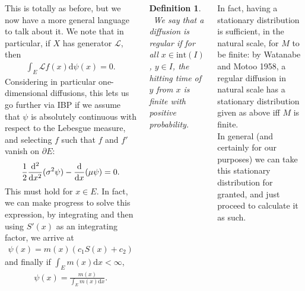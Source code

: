 \documentclass{tikzposter} %
\newcommand{\mc}{\mathcal}
\let\textd\d
\renewcommand{\d}{%
  \ifmmode
    \mathrm{d}%
  \else
    \textd%
  \fi
}
\newcommand\diff[2]{\ensuremath{\frac{\d #1}{\d #2}}}
\newcommand\kdiff[3]{\ensuremath{\frac{\d^{#1} #2}{\d #3^{#1}}}}
\newtheorem{definition}{Definition}
\begin{document}
\begin{columns}
{    This is totally as before, but we now have a more general language to talk about it. We note that in particular, if $X$ has generator $\mc{L}$, then
    \begin{align*}
      \int_E \mc{L}f(x) \mathrm{d}\psi(x) = 0.
    \end{align*}
    Considering in particular one-dimensional diffusions, this lets us go further via IBP if we assume that $\psi$ is absolutely continuous with respect to the Lebesgue measure, and selecting $f$ such that $f$ and $f'$ vanish on $\partial E$:
    \begin{align*}
      \frac{1}{2} \kdiff{2}{}{x}(\sigma^2 \psi) - \diff{}{x}(\mu \psi) = 0.
    \end{align*}
    This must hold for $x \in E$. In fact, we can make progress to solve this expression, by integrating and then using $S'(x)$ as an integrating factor, we arrive at
    \begin{align*}
      \psi(x) = m(x) \left(c_1 S(x) + c_2\right)
    \end{align*}
    and finally if $\int_E m(x) \mathrm{d}x < \infty$,
    \begin{align*}
      \psi(x) = \frac{m(x)}{\int_E m(x) \mathrm{d}x}.
    \end{align*}
    \begin{definition}
    \ We say that a diffusion is regular if for all $x \in \mathrm{int}(I)$, $y \in I$, the hitting time of $y$ from $x$ is finite with positive probability.
    \end{definition}
    \hphantom{}

    In fact, having a stationary distribution is sufficient, in the natural scale, for $M$ to be finite: by Watanabe and Motoo 1958, a regular diffusion in natural scale has a stationary distribution given as above iff $M$ is finite. \\

    In general (and certainly for our purposes) we can take this stationary distribution for granted, and just proceed to calculate it as such. \\

}
\end{columns}
\end{document}
